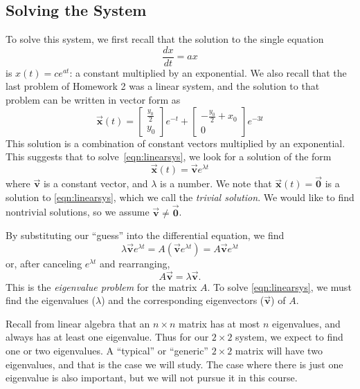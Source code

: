 \documentclass[reqno]{immbook}
\newcommand{\BV}{\vec{\textbf{v}}}
\newcommand{\BX}{\vec{\textbf{x}}}
\newcommand{\BZ}{\vec{\textbf{0}}}  %
\begin{document}
\subsection*{Solving the System}
To solve this system, we first recall that the solution to the
single equation
\begin{equation}
  \frac{dx}{dt} = a x
\end{equation}
is $x(t) = c e^{at}$: a constant multiplied by
an exponential.  We also recall that the last problem of Homework 2
was a linear system, and the solution to that problem can be
written in vector form as
\begin{equation}
 \BX(t) = \begin{bmatrix} \frac{y_0}{2} \\ y_0 \end{bmatrix} e^{-t}
            +\begin{bmatrix} -\frac{y_0}{2}+x_0 \\ 0 \end{bmatrix} e^{-3t}
\end{equation}
This solution is a combination of constant vectors
multiplied by an exponential.
This suggests that to solve~\eqref{eqn:linearsys},
we look for a solution of the form
\begin{equation}
  \BX(t) = \BV e^{\lambda t}
\end{equation}
where $\BV$ is a constant vector, and $\lambda$ is a number.
We note that $\BX(t) = \BZ$ is a solution to \eqref{eqn:linearsys},
which we call the \emph{trivial solution}.
We would like to
find nontrivial solutions, so we assume $\BV\ne \BZ$.

By substituting our ``guess'' into the differential equation, we
find
\begin{equation}
  \lambda \BV e^{\lambda t} = A\left(\BV e^{\lambda t}\right)
       = A\BV e^{\lambda t}
\end{equation}
or, after canceling $e^{\lambda t}$ and rearranging,
\begin{equation}
   A\BV = \lambda \BV.
\label{eqn:eigenvalueprob}
\end{equation}
This is the \emph{eigenvalue problem}
for the matrix $A$.
To solve \eqref{eqn:linearsys}, we must find
the eigenvalues ($\lambda$) and
the corresponding eigenvectors ($\BV$) of $A$.

Recall from linear algebra that an $n\times n$ matrix
has at most $n$ eigenvalues, and always has at least
one eigenvalue.  Thus for our $2\times 2$
system, we expect to find one or two eigenvalues.
A ``typical'' or ``generic'' $2\times 2$ matrix
will have two eigenvalues, and that is the case
we will study.  The case where there is just one
eigenvalue is also important, but we will not pursue
it in this course.
\end{document}
